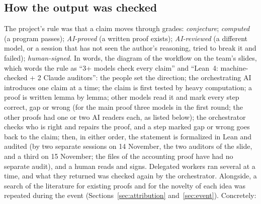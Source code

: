 \documentclass[11pt]{article}
\theoremstyle{definition}
\theoremstyle{remark}
\numberwithin{equation}{section}
\numberwithin{figure}{section}
\begin{document}
\subsection{How the output was checked}
The project's rule was that a claim moves through grades: \emph{conjecture}; \emph{computed} (a program
passes); \emph{AI-proved} (a written proof exists); \emph{AI-reviewed} (a different model, or a session that
has not seen the author's reasoning, tried to break it and failed); \emph{human-signed}. In words, the
diagram of the workflow on the team's slides, which words the rule as ``3+ models check every claim'' and
``Lean~4: machine-checked + 2 Claude auditors'': the people set the direction; the orchestrating AI introduces one claim at a time;
the claim is first tested by heavy computation; a proof is written lemma by lemma; other models read it and
mark every step correct, gap or wrong (for the main proof three models in the first round; the other proofs
had one or two AI readers each, as listed below); the orchestrator checks who is right and repairs the proof, and
a step marked gap or wrong goes back to the claim; then, in either order, the statement is formalized in Lean
and audited (by two separate sessions on 14 November, the two auditors of the slide, and a third on
15 November; the files of the accounting proof have had no separate audit), and a human reads and signs.
Delegated workers ran several at a time, and what they returned was checked again by the orchestrator. Alongside, a search of the literature for existing proofs and for the
novelty of each idea was repeated during the event (Sections~\ref{sec:attribution} and~\ref{sec:event}).
Concretely:
\end{document}
